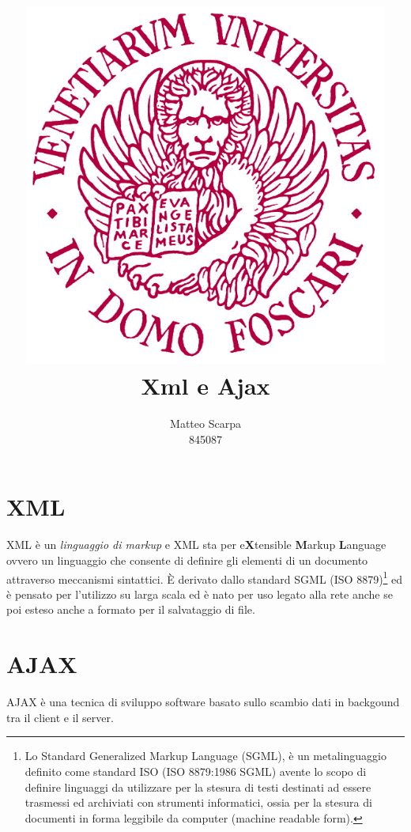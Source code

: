 \documentclass{report}
\title{\includegraphics[width=120mm]{logo-unive.png} \\ Xml e Ajax}
\author{Matteo Scarpa\\ 845087}
\date{}
\begin{document}
\maketitle

\chapter{XML}
XML è un \textit{linguaggio di markup} e XML sta per e\textbf{X}tensible \textbf{M}arkup \textbf{L}anguage ovvero un linguaggio che consente di definire gli elementi di un documento attraverso meccanismi sintattici.
È derivato dallo standard SGML (ISO 8879)\footnote{Lo Standard Generalized Markup Language (SGML), è un metalinguaggio definito come standard ISO (ISO 8879:1986 SGML) avente lo scopo di definire linguaggi da utilizzare per la stesura di testi destinati ad essere trasmessi ed archiviati con strumenti informatici, ossia per la stesura di documenti in forma leggibile da computer (machine readable form).} 
ed è pensato per l'utilizzo su larga scala ed è nato per uso legato alla rete anche se poi esteso anche a formato per il salvataggio di file.

\chapter{AJAX}
AJAX è una tecnica di sviluppo software basato sullo scambio dati in backgound tra il client e il server. 

\nocite{w3c}
\printbibliography
\end{document}
